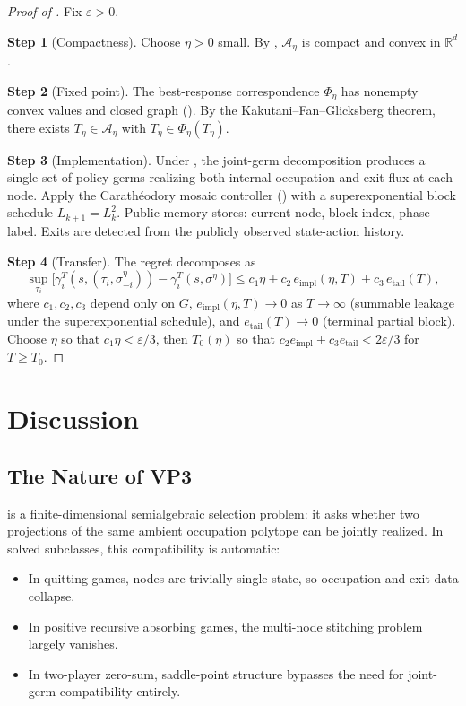 \documentclass[12pt,a4paper]{article}
\theoremstyle{definition}
\newcommand{\eps}{\varepsilon}
\newcommand{\R}{\mathbb{R}}
\begin{document}
\begin{proof}[Proof of ]
Fix $\eps > 0$.

\textbf{Step 1} (Compactness).  Choose $\eta > 0$ small.  By , $\mathcal{A}_\eta$ is compact and convex in $\R^d$.

\textbf{Step 2} (Fixed point).  The best-response correspondence $\Phi_\eta$ has nonempty convex values and closed graph ().  By the Kakutani--Fan--Glicksberg theorem, there exists $T_\eta \in \mathcal{A}_\eta$ with $T_\eta \in \Phi_\eta(T_\eta)$.

\textbf{Step 3} (Implementation).  Under , the joint-germ decomposition produces a single set of policy germs realizing both internal occupation and exit flux at each node.  Apply the Carath\'eodory mosaic controller () with a superexponential block schedule $L_{k+1} = L_k^2$.  Public memory stores: current node, block index, phase label.  Exits are detected from the publicly observed state-action history.

\textbf{Step 4} (Transfer).  The regret decomposes as
\[
\sup_{\tau_i} \bigl[\gamma_i^T(s, (\tau_i, \sigma_{-i}^\eta)) - \gamma_i^T(s, \sigma^\eta)\bigr] \leq c_1 \eta + c_2 \, e_{\mathrm{impl}}(\eta, T) + c_3 \, e_{\mathrm{tail}}(T),
\]
where $c_1, c_2, c_3$ depend only on $G$, $e_{\mathrm{impl}}(\eta, T) \to 0$ as $T \to \infty$ (summable leakage under the superexponential schedule), and $e_{\mathrm{tail}}(T) \to 0$ (terminal partial block).  Choose $\eta$ so that $c_1 \eta < \eps/3$, then $T_0(\eta)$ so that $c_2 e_{\mathrm{impl}} + c_3 e_{\mathrm{tail}} < 2\eps/3$ for $T \geq T_0$.
\end{proof}

\section{Discussion}
\label{sec:vp3-discussion}

\subsection{The Nature of VP3}

 is a finite-dimensional semialgebraic selection problem: it asks whether two projections of the same ambient occupation polytope can be jointly realized.  In solved subclasses, this compatibility is automatic:
\begin{itemize}
\item In quitting games, nodes are trivially single-state, so occupation and exit data collapse.
\item In positive recursive absorbing games, the multi-node stitching problem largely vanishes.
\item In two-player zero-sum, saddle-point structure bypasses the need for joint-germ compatibility entirely.
\end{itemize}
\end{document}
